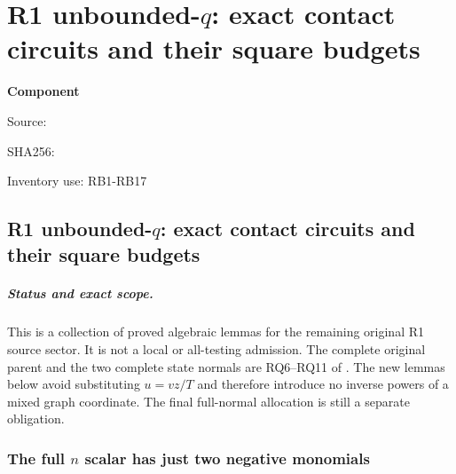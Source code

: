 \chapter{R1 unbounded-$q$: exact contact circuits and their square budgets}
\label{component:p6db37c4233da}
\noindent\textbf{Component }\par
{\small\noindent Source: \par}
{\small\noindent SHA256: \par}
{\small\noindent Inventory use: RB1-RB17\par}
\medskip
\section{R1 unbounded-$q$: exact contact circuits and their square budgets}
\label{p6db37c4233da:sec:r1-qo-contact-circuit-budgets}

\paragraph{Status and exact scope.}
This is a collection of proved algebraic lemmas for the remaining
original R1 source sector. It is not a local or all-testing admission.
The complete original parent and the two complete state normals are
RQ6--RQ11 of .
The new lemmas below avoid substituting $u=vz/T$ and therefore introduce
no inverse powers of a mixed graph coordinate. The final full-normal
allocation is still a separate obligation.

\subsection{The full $n$ scalar has just two negative monomials}

